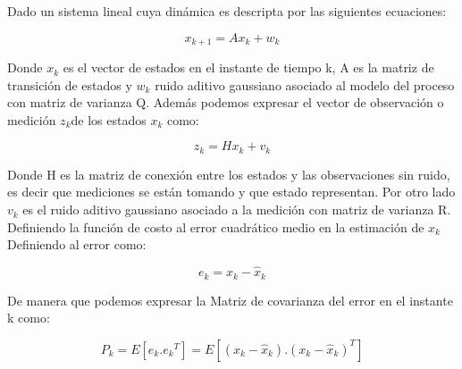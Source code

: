 \documentclass[10pt,a4paper]{article}
\begin{document}
	Dado un sistema lineal cuya dinámica es descripta por las siguientes ecuaciones:\\
	
	\begin{figure}[h!]
		\begin{center}
			\begin{equation}
				x_{k+1}= Ax_{k} + w_{k}
				\label{KF_equation01}
			\end{equation}	
		\end{center}
	\end{figure}
	
	Donde $x_{k}$ es el vector de estados en el instante de tiempo k, A es la matriz de transición de estados y $w_{k}$ ruido aditivo gaussiano asociado al modelo del proceso con matriz de varianza Q. 
	Además podemos expresar el vector de observación o medición $z_{k} $de los estados $x_{k}$ como:
	
	\begin{figure}[h!]
		\begin{center}
			\begin{equation}
				z_{k}= Hx_{k} + v_{k}
				\label{KF_equation02}
			\end{equation}	
		\end{center}
	\end{figure}
	
	
	Donde H es la matriz de conexión entre los estados y las observaciones sin ruido, es decir que mediciones se están tomando y que estado representan. Por otro lado $v_{k}$ es el ruido aditivo gaussiano asociado a la medición con matriz de varianza R.\\
	
	Definiendo la función de costo al error cuadrático medio en la estimación de $x_k$ \\
	
	
	Definiendo al error como: 
	
	\begin{figure}[h!]
		\begin{center}
			\begin{equation}
				e_{k} = x_k  - \hat{x}_k
				\label{KF_error}
			\end{equation}	
		\end{center}
	\end{figure}
	
	
	
	
	De manera que podemos expresar la Matriz de covarianza del error en el instante k como:
	
	\begin{figure}[h!]
		\begin{center}
			\begin{equation}
				P_{k} = E[e_k.{e_k}^{T}] = E[(x_k-\hat{x}_k).(x_k-\hat{x}_k)^{T}]
				\label{KF_equation03}
			\end{equation}	
		\end{center}
	\end{figure}
	
\end{document}
